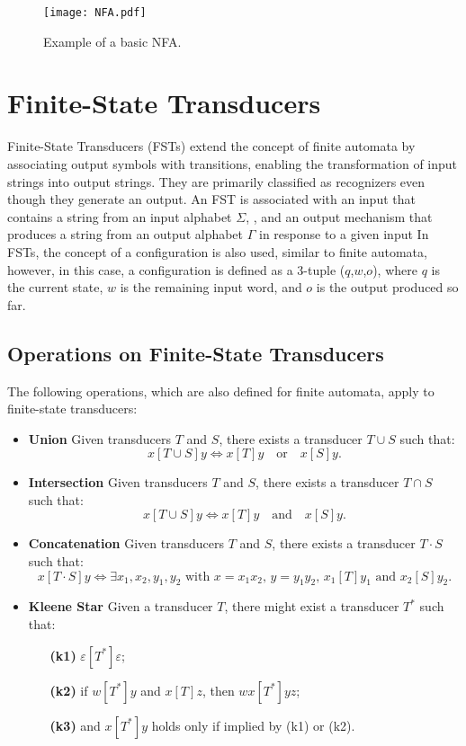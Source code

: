 \begin{figure}[H]
    \centering
    \texttt{[image: NFA.pdf]}
    \caption{Example of a basic NFA.}
    \label{fig:1}
\end{figure}


\section{Finite-State Transducers}

Finite-State Transducers (FSTs) extend the concept of finite automata by associating output symbols with transitions, 
enabling the transformation of input strings into output strings. They are primarily classified as recognizers even though they generate an output.
An FST is associated with an input that contains a string from an input alphabet $\Sigma$,
, and an output mechanism that produces a string from an output alphabet $\Gamma$ in response to a given input
In FSTs, the concept of a configuration is also used, similar to finite automata, however, in this case, 
a configuration is defined as a 3-tuple (\(q\),\(w\),\(o\)), where \(q\) is the current state, \(w\) is the remaining input word, and \(o\) is the output produced so far.

\subsection{Operations on Finite-State Transducers}

The following operations, which are also defined for finite automata, apply to finite-state transducers:\cite{finite_state_transducer}

\begin{itemize}
    \item \textbf{Union} Given transducers $T$ and $S$, there exists a transducer $T \cup S$ such that:
    \[
    x[T \cup S]y \iff x[T]y \quad \text{or} \quad x[S]y.
    \]

    \item \textbf{Intersection} Given transducers $T$ and $S$, there exists a transducer $T \cap S$ such that:
    \[
    x[T \cup S]y \iff x[T]y \quad \text{and} \quad x[S]y.
    \]

    \item \textbf{Concatenation} Given transducers $T$ and $S$, there exists a transducer $T \cdot S$ such that:
    \[
    x[T \cdot S]y \iff \exists x_1, x_2, y_1, y_2 \text{ with } x = x_1 x_2,\, y = y_1 y_2,\, x_1[T]y_1 \text{ and } x_2[S]y_2.
    \]

    \item \textbf{Kleene Star} Given a transducer $T$, there might exist a transducer $T^*$ such that:
    \begin{itemize}
        \item[\textbf{(k1)}] $\varepsilon[T^*]\varepsilon$;
        \item[\textbf{(k2)}] if $w[T^*]y$ and $x[T]z$, then $wx[T^*]yz$;
        \item[\textbf{(k3)}] and $x[T^*]y$ holds only if implied by (k1) or (k2).
    \end{itemize}

\end{itemize}

